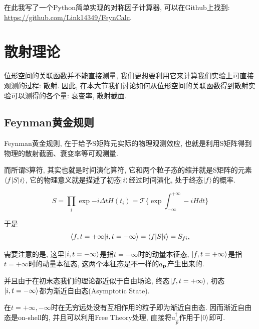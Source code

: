 在此我写了一个Python简单实现的对称因子计算器, 可以在Github上找到: \url{https://github.com/Link14349/FeynCalc}.


\newpage

\section{散射理论}
位形空间的关联函数并不能直接测量, 我们更想要利用它来计算我们实验上可直接观测的过程: 散射. 因此, 在本大节我们讨论如何从位形空间的关联函数得到散射实验可以测得的各个量: 衰变率, 散射截面.
\subsection{Feynman黄金规则}
Feynman黄金规则, 在于给予S矩阵元实际的物理观测效应, 也就是利用S矩阵得到物理的散射截面、衰变率等可观测量.

而所谓S算符, 其实也就是时间演化算符, 它和两个粒子态的缩并就是S矩阵的元素$\braket{f|S|i}$, 它的物理意义就是描述了初态$\ket i$经过时间演化, 处于终态$\ket f$的概率.
\begin{definition}[S算符]
    \begin{equation}
        S=\prod_i\exp{-i\Delta tH(t_i)}=\mathcal T\{\exp{\int_{-\infty}^{+\infty} -iHdt}\}
    \end{equation}
\end{definition}

于是
\begin{equation}
    \braket{f, t=+\infty|i, t=-\infty}=\braket{f|S|i}=S_{fi},
\end{equation}

需要注意的是, 这里$\ket{i, t=-\infty}$是指$t=-\infty$时的动量本征态, $\ket{f, t=+\infty}$是指$t=+\infty$时的动量本征态, 这两个本征态是不一样的$a_{\mathbf{p}}$产生出来的.

并且由于在初末态我们的理论都近似于自由场论, 终态$\ket{f, t=+\infty}$, 初态$\ket{i, t=-\infty}$都为渐近自由态(Asymptotic State).

\begin{definition}
    在$t=+\infty, -\infty$时在无穷远处没有互相作用的粒子即为渐近自由态. 因而渐近自由态是on-shell的, 并且可以利用Free Theory处理, 直接将$a^\dagger_{\vec p}$作用于$\ket0$即可.
\end{definition}

